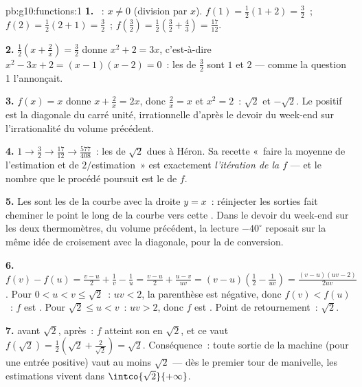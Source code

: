 \begin{solution}{pb:g10:functions:1}
\textbf{1.} ~: $x \neq 0$ (division par $x$).
$f(1) = \frac12(1 + 2) = \frac32$~; $f(2) = \frac12(2 + 1) =
\frac32$~; $f\!\left(\frac32\right) = \frac12\left(\frac32 +
\frac43\right) = \frac{17}{12}$.

\textbf{2.} $\frac12\left(x + \frac2x\right) = \frac32$ donne
$x^2 + 2 = 3x$, c'est-à-dire $x^2 - 3x + 2 = (x - 1)(x - 2) = 0$~:
les  de $\frac32$ sont $1$ et $2$ --- comme la question 1
l'annonçait.

\textbf{3.} $f(x) = x$ donne $x + \frac2x = 2x$, donc $\frac2x = x$
et $x^2 = 2$~:  $\sqrt2$ et $-\sqrt2$. Le 
positif est la diagonale du carré unité, irrationnelle d'après le
devoir du week-end sur l'irrationalité du volume précédent.

\textbf{4.} $1 \to \frac32 \to \frac{17}{12} \to \frac{577}{408}$~:
les  de $\sqrt2$ dues à Héron. Sa recette «~faire la
moyenne de l'estimation et de $2/$estimation~» est exactement
\emph{l'itération de la  $f$} --- et le nombre que le procédé
poursuit est le  de $f$.

\textbf{5.} Les  sont les  de la courbe avec
la droite $y = x$~: réinjecter les sorties fait cheminer le point le
long de la courbe vers cette . Dans le devoir du week-end
sur les deux thermomètres, du volume précédent, la lecture
$-40^\circ$ reposait sur la même idée de croisement avec la
diagonale, pour la  de conversion.

\textbf{6.} $f(v) - f(u) = \frac{v - u}{2} + \frac1v - \frac1u
= \frac{v - u}{2} + \frac{u - v}{uv}
= (v - u)\left(\frac12 - \frac{1}{uv}\right)
= \frac{(v - u)(uv - 2)}{2uv}$. Pour $0 < u < v \leq \sqrt2$~:
$uv < 2$, la parenthèse est négative, donc $f(v) < f(u)$~: $f$ est
. Pour $\sqrt2 \leq u < v$~: $uv > 2$, donc $f$ est
. Point de retournement~: $\sqrt2$.

\textbf{7.}  avant $\sqrt2$,  après~: $f$
atteint son  en $\sqrt2$, et ce  vaut
$f(\sqrt2) = \frac12\left(\sqrt2 + \frac{2}{\sqrt2}\right) =
\sqrt2$. Conséquence~: toute sortie de la machine (pour une entrée
positive) vaut au moins $\sqrt2$ --- dès le premier tour de
manivelle, les estimations vivent dans $\intco{\sqrt2}{+\infty}$.


\end{solution}
